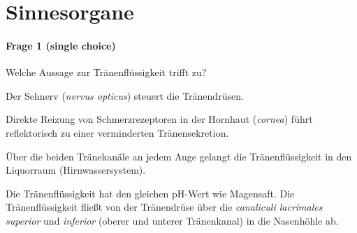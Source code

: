 \section*{Sinnesorgane}

\paragraph{Frage 1 (single choice)}

Welche Aussage zur Tränenflüssigkeit trifft zu?

\begin{benumerate}
  \item Der Sehnerv (\emph{nervus opticus}) steuert die Tränendrüsen.
  \item Direkte Reizung von Schmerzrezeptoren in der Hornhaut (\emph{cornea}) führt reflektorisch zu einer verminderten Tränensekretion.
  \item Über die beiden Tränekanäle an jedem Auge gelangt die Tränenflüssigkeit in den Liquorraum (Hirnwassersystem).
  \item Die Tränenflüssigkeit hat den gleichen pH-Wert wie Magensaft.
  \bolditem Die Tränenflüssigkeit fließt von der Tränendrüse über die \emph{canaliculi lacrimales superior} und \emph{inferior} (oberer und unterer Tränenkanal) in die Nasenhöhle ab.
\end{benumerate}